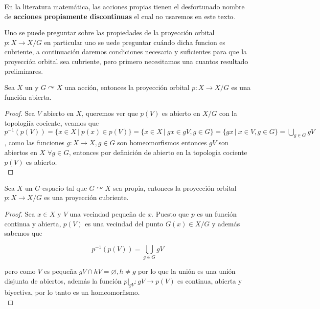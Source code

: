 En la literatura matem\'atica, las acciones propias tienen el desfortunado nombre de \textbf{acciones propiamente discontinuas} el cual no usaremos en este texto.

Uno se puede preguntar sobre las propiedades de la proyecci\'on orbital $p: X \rightarrow X/G$ en particular uno se uede preguntar cu\'ando dicha funcion es cubriente, a continuaci\'on daremos condiciones necesaria y suficientes para que la proyecci\'on orbital sea cubriente, pero primero necesitamos una cuantos resultado preliminares.\\

\begin{lemma}
Sea $X$ un y $G \curvearrowright X$ una acci\'on, entonces la proyecci\'on orbital $p:X \rightarrow X/G$ es una funci\'on abierta. 
\end{lemma} 

\begin{proof}
Sea $V$ abierto en $X$, queremos ver que $p(V)$ es abierto en $X/G$ con la topologi\'ia cociente, veamos que $p^{-1}(p(V))=\lbrace x \in X \: |  \: p(x) \in p(V)\rbrace = \lbrace x \in X \: | \: gx \in gV , g \in G \rbrace = \lbrace gx \: | \: x \in V, g \in G  \rbrace = \bigcup_{g \in G}gV$, como las funciones $g:X \rightarrow X, g \in G$ son homeomorfismos entonces $gV$ son abiertos en $X$ $\forall g \in G$, entonces por definici\'on de abierto en la topolog\'ia cociente $p(V)$ es abierto.\\ 
\end{proof}


\begin{theorem}\label{PropImplicCubr}
Sea $X$ un $G$-espacio tal que $G \curvearrowright X$ sea propia, entonces la proyecci\'on orbital $p:X \rightarrow X/G$ es una proyecci\'on cubriente.
\end{theorem}

\begin{proof}
Sea $x \in X$ y $V$ una vecindad peque\~na de $x$. Puesto que $p$ es un funci\'on continua y abierta, $p(V)$ es una vecindad del punto $G(x) \in X/G$ y adem\'as sabemos que 

$$p^{-1}(p(V))= \bigcup_{g \in G} gV$$ 

pero como $V$ es peque\~na $gV \cap hV = \varnothing, h \neq g$ por lo que la uni\'on es una uni\'on disjunta de abiertos, adem\'as la funci\'on $p \vert_{gV}:gV \rightarrow p(V)$ es continua, abierta y biyectiva, por lo tanto es un homeomorfismo.\\
\end{proof}


